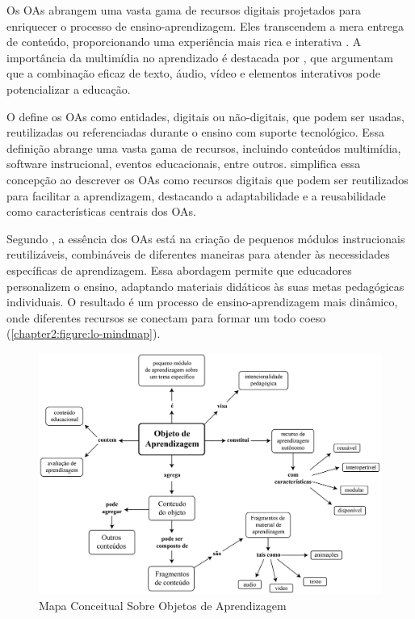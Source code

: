 Os OAs abrangem uma vasta gama de recursos digitais projetados para enriquecer o processo de ensino-aprendizagem. Eles transcendem a mera entrega de conteúdo, proporcionando uma experiência mais rica e interativa \cite{Wiley2000}. A importância da multimídia no aprendizado é destacada por , que argumentam que a combinação eficaz de texto, áudio, vídeo e elementos interativos pode potencializar a educação.


O  define os OAs como entidades, digitais ou não-digitais, que podem ser usadas, reutilizadas ou referenciadas durante o ensino com suporte tecnológico. Essa definição abrange uma vasta gama de recursos, incluindo conteúdos multimídia, software instrucional, eventos educacionais, entre outros.  simplifica essa concepção ao descrever os OAs como recursos digitais que podem ser reutilizados para facilitar a aprendizagem, destacando a adaptabilidade e a reusabilidade como características centrais dos OAs.

Segundo , a essência dos OAs está na criação de pequenos módulos instrucionais reutilizáveis, combináveis de diferentes maneiras para atender às necessidades específicas de aprendizagem. Essa abordagem permite que educadores personalizem o ensino, adaptando materiais didáticos às suas metas pedagógicas individuais. O resultado é um processo de ensino-aprendizagem mais dinâmico, onde diferentes recursos se conectam para formar um todo coeso (\autoref{chapter2:figure:lo-mindmap}).

\begin{figure}[htb]
\centering
\caption{Mapa Conceitual Sobre Objetos de Aprendizagem}
\label{chapter2:figure:lo-mindmap}
\includegraphics[width=1\textwidth]{images/chapter2-lo-mindmap.jpg}
\end{figure}


